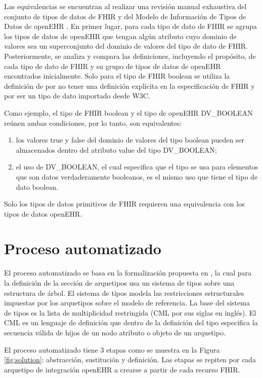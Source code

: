 Las equivalencias se encuentran al realizar una revisión manual exhaustiva del conjunto de tipos de datos de FHIR \cite{FHIRDataTypes} y del Modelo de Información de Tipos de Datos de openEHR \cite{openEHRDataTypes}. En primer lugar, para cada tipo de dato de FHIR se agrupa los tipos de datos de openEHR que tengan algún atributo cuyo dominio de valores sea un superconjunto del dominio de valores del tipo de dato de FHIR. Posteriormente, se analiza y compara las definiciones, incluyendo el propósito, de cada tipo de dato de FHIR y su grupo de tipos de datos de openEHR encontrados inicialmente. Solo para el tipo de FHIR boolean se utiliza la definición de \cite{W3C} por no tener una definición explícita en la especificación de FHIR y por ser un tipo de dato importado desde W3C.

Como ejemplo, el tipo de FHIR boolean y el tipo de openEHR DV\_BOOLEAN reúnen ambas condiciones, por lo tanto, son equivalentes:
\begin{enumerate}
  \item los valores true y false del dominio de valores del tipo boolean pueden ser almacenados dentro del atributo value del tipo DV\_BOOLEAN;
  \item el uso de DV\_BOOLEAN, el cual especifica que el tipo se usa para elementos que son datos verdaderamente booleanos, es el mismo uso que tiene el tipo de dato boolean.
\end{enumerate}

Solo los tipos de datos primitivos de FHIR requieren una equivalencia con los tipos de datos openEHR.

\section{Proceso automatizado}

El proceso automatizado se basa en la formalización propuesta en \cite{Maldonado09}, la cual para la definición de la sección de arquetipos usa un sistema de tipos sobre una estructura de árbol. El sistema de tipos modela las restricciones estructurales impuestas por los arquetipos sobre el modelo de referencia. La base del sistema de tipos es la lista de multiplicidad restringida (CML por sus siglas en inglés). El CML es un lenguaje de definición que dentro de la definición del tipo especifica la secuencia válida de hijos de un nodo atributo o objeto de un arquetipo.

El proceso automatizado tiene 3 etapas como se muestra en la Figura \ref{fig:solution}: abstracción, sustitución y definición. Las etapas se repiten por cada arquetipo de integración openEHR a crearse a partir de cada recurso FHIR.

